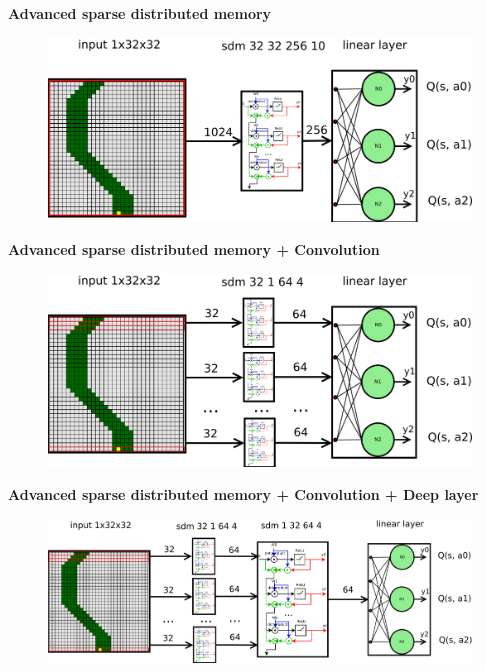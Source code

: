 \documentclass[xcolor=dvipsnames]{beamer}
\begin{document}
\begin{frame}{\bf Advanced sparse distributed memory}

\centering

\begin{figure}[C]
   \includegraphics[scale=0.18]{../diagrams/convolution_01.png}
\end{figure}

\end{frame}


\begin{frame}{\bf Advanced sparse distributed memory + Convolution}

\centering

\begin{figure}[C]
   \includegraphics[scale=0.18]{../diagrams/convolution_02.png}
\end{figure}

\end{frame}


\begin{frame}{\bf  Advanced sparse distributed memory + Convolution + Deep layer}

\centering

\begin{figure}[C]
   \includegraphics[scale=0.14]{../diagrams/convolution_03.png}
\end{figure}

\end{frame}
\end{document}
